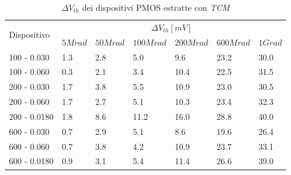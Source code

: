 \documentclass[12pt, letterpaper]{book}
\begin{document}
\begin{table}[H]
  \renewcommand{\arraystretch}{1.3}
  \begin{tabular}{m{2.1cm}  m{1.1cm} m{1.3cm} m{1.5cm} m{1.5cm} m{1.5cm} m{1cm}}
    \toprule
    \multirow{2}{*}{Dispositivo} & \multicolumn{6}{c}{$\Delta V_{th} [mV] $}                                                          \\
    \cmidrule{2-7}
                                 & $5Mrad$                                   & $50Mrad$ & $100Mrad$ & $200Mrad$ & $600Mrad$ & $1Grad$ \\
    \midrule
    100 - 0.030                     & 1.3                                       & 2.8      & 5.0       & 9.6       & 23.2      & 30.0    \\
    \hline
    100 - 0.060                     & 0.3                                       & 2.1      & 3.4       & 10.4      & 22.5      & 31.5    \\
    \hline
    200 - 0.030                     & 1.7                                       & 3.8      & 5.5       & 10.9      & 23.0      & 30.5    \\
    \hline
    200 - 0.060                     & 1.7                                       & 2.7      & 5.1       & 10.3      & 23.4      & 32.3    \\
    \hline
    200 - 0.0180                    & 1.8                                       & 8.6      & 11.2      & 16.0      & 28.8      & 40.0    \\
    \hline
    600 - 0.030                     & 0.7                                       & 2.9      & 5.1       & 8.6       & 19.6      & 26.4    \\
    \hline
    600 - 0.060                     & 0.7                                       & 3.8      & 4.2       & 10.9      & 23.7      & 33.1    \\
    \hline
    600 - 0.0180                    & 0.9                                       & 3.1      & 5.4       & 11.4      & 26.6      & 39.0    \\
    \bottomrule
  \end{tabular}
  \caption{$\Delta V_{th}$ dei dispositivi PMOS estratte con \emph{TCM}}
  \label{tab:deltaVthTCMP}
\end{table}
\end{document}

